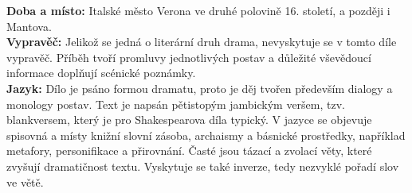 \documentclass[12pt, a4paper]{article}
\newcommand{\mybf}[1]{\textcolor[RGB]{0, 179, 219}{\textbf{#1}}}
\begin{document}
\mybf{Doba a místo:} Italské město Verona ve druhé polovině 16. století, a později i Mantova.\\[10pt]
\mybf{Vypravěč:} Jelikož se jedná o literární druh drama, nevyskytuje se v tomto díle vypravěč. Příběh tvoří promluvy jednotlivých postav a důležité vševědoucí informace doplňují scénické poznámky.\\[10pt]
\mybf{Jazyk:} Dílo je psáno formou dramatu, proto je děj tvořen především dialogy a monology postav. Text je napsán pětistopým jambickým veršem, tzv. blankversem, který je pro Shakespearova díla typický. V jazyce se objevuje spisovná a místy knižní slovní zásoba, archaismy a básnické prostředky, například metafory, personifikace a přirovnání. Časté jsou tázací a zvolací věty, které zvyšují dramatičnost textu. Vyskytuje se také inverze, tedy nezvyklé pořadí slov ve větě.
\end{document}
